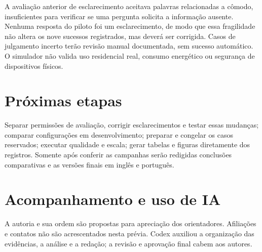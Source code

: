 \documentclass[letterpaper,conference]{IEEEtran}
\begin{document}
A avaliação anterior de esclarecimento aceitava palavras relacionadas a cômodo, insuficientes para verificar se uma pergunta solicita a informação ausente. Nenhuma resposta do piloto foi um esclarecimento, de modo que essa fragilidade não altera os nove sucessos registrados, mas deverá ser corrigida. Casos de julgamento incerto terão revisão manual documentada, sem sucesso automático. O simulador não valida uso residencial real, consumo energético ou segurança de dispositivos físicos.
\section{Próximas etapas}
Separar permissões de avaliação, corrigir esclarecimentos e testar essas mudanças; comparar configurações em desenvolvimento; preparar e congelar os casos reservados; executar qualidade e escala; gerar tabelas e figuras diretamente dos registros. Somente após conferir as campanhas serão redigidas conclusões comparativas e as versões finais em inglês e português.
\section*{Acompanhamento e uso de IA}
A autoria e sua ordem são propostas para apreciação dos orientadores. Afiliações e contatos não são acrescentados nesta prévia. Codex auxiliou a organização das evidências, a análise e a redação; a revisão e aprovação final cabem aos autores.


\end{document}
